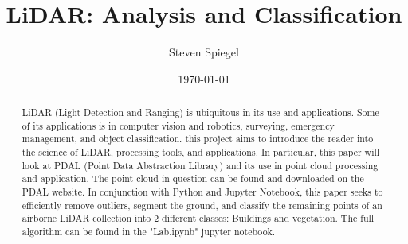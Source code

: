 \documentclass[11pt]{article}
\theoremstyle{definition}
\begin{document}
	\lstset{language=python} 
	\title{LiDAR: Analysis and Classification}
	
	\author{Steven Spiegel}
	\date{\today}
	\maketitle

	\begin{abstract}
		LiDAR (Light Detection and Ranging) is ubiquitous in its use and applications.  Some of its applications is in computer vision and robotics, surveying, emergency management, and object classification.  this project aims to introduce the reader into the science of LiDAR, processing tools, and applications.  In particular, this paper will look at PDAL (Point Data Abstraction Library) and its use in point cloud processing and application.  The point cloud in question can be found and downloaded on the PDAL website. In conjunction with Python and Jupyter Notebook, this paper seeks to efficiently remove outliers, segment the ground, and classify the remaining points of an airborne LiDAR collection into 2 different classes: Buildings and vegetation. The full algorithm can be found in the "Lab.ipynb" jupyter notebook.  
	\end{abstract}
	\newpage
\end{document}
